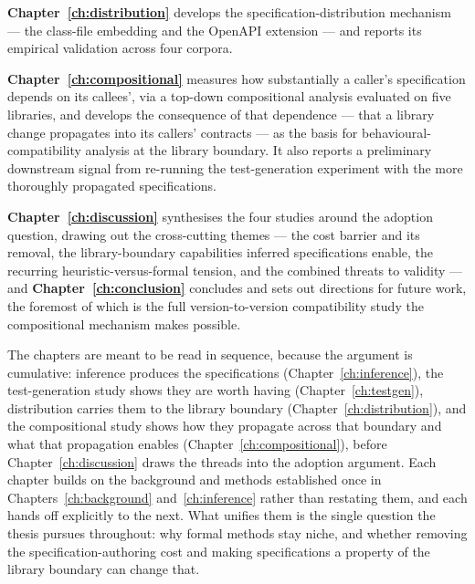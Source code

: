 \textbf{Chapter~\ref{ch:distribution}} develops the specification-distribution
mechanism --- the class-file embedding and the OpenAPI extension --- and
reports its empirical validation across four corpora.

\textbf{Chapter~\ref{ch:compositional}} measures how substantially a caller's
specification depends on its callees', via a top-down compositional analysis
evaluated on five libraries, and develops the consequence of that dependence ---
that a library change propagates into its callers' contracts --- as the basis for
behavioural-compatibility analysis at the library boundary. It also reports a
preliminary downstream signal from re-running the test-generation experiment with
the more thoroughly propagated specifications.

\textbf{Chapter~\ref{ch:discussion}} synthesises the four studies around the
adoption question, drawing out the cross-cutting themes --- the cost barrier and
its removal, the library-boundary capabilities inferred specifications enable, the
recurring heuristic-versus-formal tension, and the combined threats to validity
--- and \textbf{Chapter~\ref{ch:conclusion}} concludes and sets out directions for
future work, the foremost of which is the full version-to-version compatibility
study the compositional mechanism makes possible.

The chapters are meant to be read in sequence, because the argument is cumulative:
inference produces the specifications (Chapter~\ref{ch:inference}), the
test-generation study shows they are worth having (Chapter~\ref{ch:testgen}),
distribution carries them to the library boundary (Chapter~\ref{ch:distribution}),
and the compositional study shows how they propagate across that boundary and what
that propagation enables (Chapter~\ref{ch:compositional}), before
Chapter~\ref{ch:discussion} draws the threads into the adoption argument. Each
chapter builds on the background and methods established once in
Chapters~\ref{ch:background} and~\ref{ch:inference} rather than restating them, and
each hands off explicitly to the next. What unifies them is the single question
the thesis pursues throughout: why formal methods stay niche, and whether removing
the specification-authoring cost and making specifications a property of the
library boundary can change that.
